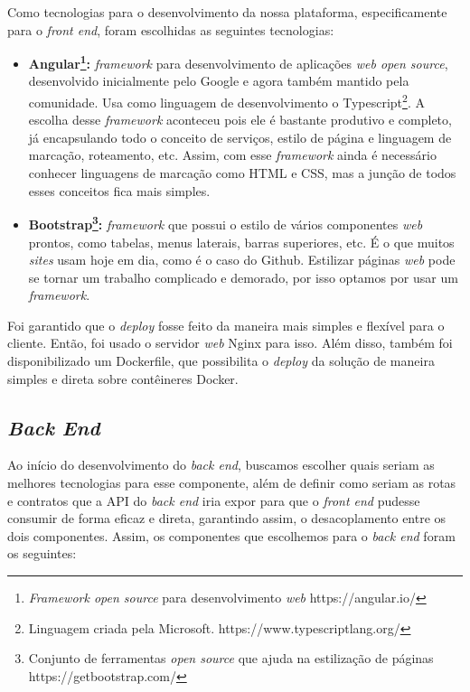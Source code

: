 \documentclass[11pt,twoside]{article}
\begin{document}
Como tecnologias para o desenvolvimento da nossa plataforma, especificamente para o \emph{front end}, foram escolhidas as seguintes tecnologias:

\begin{itemize}
  \item \textbf{Angular\footnote{\emph{Framework open source} para desenvolvimento \emph{web} https://angular.io/}:} \emph{framework} para desenvolvimento de aplicações \emph{web open source}, desenvolvido inicialmente pelo Google e agora também mantido pela comunidade. Usa como linguagem de desenvolvimento o
  Typescript\footnote{Linguagem criada pela Microsoft. https://www.typescriptlang.org/}. A escolha desse \emph{framework} aconteceu pois ele é bastante produtivo e completo, já encapsulando todo o conceito de serviços, estilo de página e 
  linguagem de marcação, roteamento, etc. Assim, com esse \emph{framework} ainda é necessário conhecer linguagens de marcação como HTML e CSS, mas a junção de todos esses conceitos fica mais simples.
  \item \textbf{Bootstrap\footnote{Conjunto de ferramentas \emph{open source} que ajuda na estilização de páginas https://getbootstrap.com/}:} \emph{framework} que possui o estilo de vários componentes \emph{web} prontos, como tabelas, menus laterais, barras superiores, etc. É o que muitos \emph{sites} usam hoje em dia, como é o caso do Github.
  Estilizar páginas \emph{web} pode se tornar um trabalho complicado e demorado, por isso optamos por usar um \emph{framework}.
\end{itemize}

Foi garantido que o \emph{deploy} fosse feito da maneira mais simples e flexível para o cliente. Então, foi usado o servidor \emph{web} Nginx para isso. Além disso, também foi disponibilizado um Dockerfile, que possibilita
o \emph{deploy} da solução de maneira simples e direta sobre contêineres Docker.

\subsection{\emph{Back End}}

Ao início do desenvolvimento do \emph{back end}, buscamos escolher quais seriam as melhores tecnologias para esse componente, além de definir como seriam as rotas e contratos que a API do \emph{back end} iria expor
para que o \emph{front end} pudesse consumir de forma eficaz e direta, garantindo assim, o desacoplamento entre os dois componentes. Assim, os componentes que escolhemos para o \emph{back end} foram os seguintes:
\end{document}
